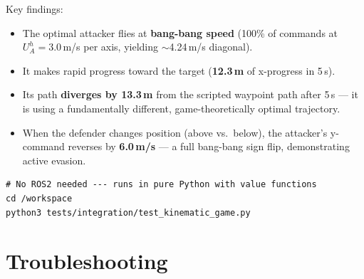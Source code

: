 \documentclass[11pt,a4paper]{article}
\begin{document}
Key findings:
\begin{itemize}[noitemsep]
    \item The optimal attacker flies at \textbf{bang-bang speed} (100\% of commands at $U_A^h = 3.0$\,m/s per axis, yielding $\sim$4.24\,m/s diagonal).
    \item It makes rapid progress toward the target (\textbf{12.3\,m} of x-progress in 5\,s).
    \item Its path \textbf{diverges by 13.3\,m} from the scripted waypoint path after 5\,s --- it is using a fundamentally different, game-theoretically optimal trajectory.
    \item When the defender changes position (above vs.\ below), the attacker's y-command reverses by \textbf{6.0\,m/s} --- a full bang-bang sign flip, demonstrating active evasion.
\end{itemize}

\begin{lstlisting}[style=bashstyle, title=\textbf{Running the standalone simulation}]
# No ROS2 needed --- runs in pure Python with value functions
cd /workspace
python3 tests/integration/test_kinematic_game.py
\end{lstlisting}


\section{Troubleshooting}
\end{document}
